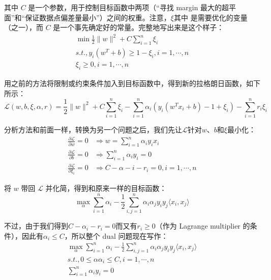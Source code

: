 \documentclass[a4paper,12pt]{article}
\begin{document}
其中 $C$ 是一个参数，用于控制目标函数中两项（“寻找 margin 最大的超平面”和“保证数据点偏差量最小”）之间的权重。注意，$\xi$其中  是需要优化的变量（之一），而 $C$ 是一个事先确定好的常量。完整地写出来是这个样子：
\begin{equation}
  \begin{split}
   \min\frac{1}{2}\|w\|^2+C\sum_{i=1}^n\xi_i\\
   s.t.,y_i(w^T+b)\geq1-\xi_i,i=1,\cdots,n\\
   \xi_i\geq0,i=1,\cdots,n
 \end{split}
 \end{equation}
  
 用之前的方法将限制或约束条件加入到目标函数中，得到新的拉格朗日函数，如下所示：
 \begin{equation}
   \mathcal{L}(w,b,\xi,\alpha,r)=\frac{1}{2}\|w\|^2+C\sum_{i=1}^n\xi_i-\sum_{i=1}^n\alpha_i\left(y_i(w^Tx_i+b)-1+\xi_i\right)-\sum_{i=1}^nr_i\xi_i
 \end{equation}

 分析方法和前面一样，转换为另一个问题之后，我们先让$\mathcal{L}$针对$w$、$b$和$\xi$最小化：
 \begin{equation}
   \begin{split}
   \frac{\partial\mathcal{L}}{\partial w} = 0 &\Rightarrow w=\sum_{i=1}^n\alpha _iy_ix_i\\
   \frac{\partial\mathcal{L}}{\partial b} = 0 &\Rightarrow \sum_{i=1}^n\alpha _iy_i=0\\
   \frac{\partial\mathcal{L}}{\partial \xi_i} = 0 &\Rightarrow C-\alpha-i-r_i=0,i=1,\cdots,n
 \end{split}
\end{equation}

将 $w$ 带回 $\mathcal{L}$ 并化简，得到和原来一样的目标函数：
\begin{equation}
\max_\alpha\sum_{i=1}^n\alpha_i-\frac{1}{2}\sum_{i,j=1}^n\alpha_i\alpha_jy_iy_j\langle x_i,x_j\rangle
\end{equation}

  不过，由于我们得到$C-\alpha_i-r_i=0$而又有$r_i\geq0$（作为 Lagrange multiplier 的条件），因此有$\alpha_i\leq C$，所以整个 dual 问题现在写作：
\begin{equation}
  \begin{split}
    \max_\alpha\sum_{i=1}^n\alpha_i-\frac{1}{2}\sum_{i,j=1}^n\alpha_i\alpha_jy_iy_j\langle x_i,x_j\rangle\\
    s.t.,0\leq\alpha\alpha_i\leq C,i=1,\cdots,n\\
    \sum_{i=1}^n\alpha_iy_i=0
  \end{split}
\end{equation}
\end{document}
